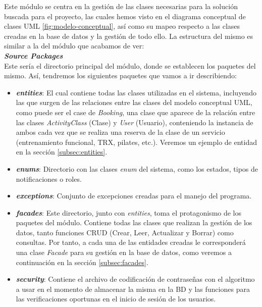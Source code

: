 Este módulo se centra en la gestión de las clases necesarias para la solución buscada para el proyecto, las cuales hemos visto en el diagrama conceptual de clases UML \ref{fig:modelo-conceptual}, así como su mapeo respecto a las clases creadas en la base de datos y la gestión de todo ello. La estructura del mismo es similar a la del módulo que acabamos de ver: 
\\

\textbf{\textit{Source Packages}}
\\

Este sería el directorio principal del módulo, donde se establecen los paquetes del mismo. Así, tendremos los siguientes paquetes que vamos a ir describiendo: 

\begin{itemize}
\item \textbf{\textit{entities}}: El cual contiene todas las clases utilizadas en el sistema, incluyendo las que surgen de las relaciones entre las clases del modelo conceptual UML, como puede ser el case de \textit{Booking}, una clase que aparece de la relación entre las clases \textit{ActivityClass} (Clase) y \textit{User} (Usuario), conteniendo la instancia de ambos cada vez que se realiza una reserva de la clase de un servicio (entrenamiento funcional, TRX, pilates, etc.). Veremos un ejemplo de entidad en la sección \ref{subsec:entities}.
\item \textbf{\textit{enums}}: Directorio con las clases \textit{enum} del sistema, como los estados, tipos de notificaciones o roles.
\item \textbf{\textit{exceptions}}: Conjunto de excepciones creadas para el manejo del programa.
\item \textbf{\textit{facades}}: Este directorio, junto con \textit{entities}, toma el protagonismo de los paquetes del módulo. Contiene todas las clases que realizan la gestión de los datos, tanto funciones CRUD (Crear, Leer, Actualizar y Borrar) como consultas. Por tanto, a cada una de las entidades creadas le corresponderá una clase \textit{Facade} para su gestión en la base de datos, como veremos a continuación en la sección \ref{subsec:facades}.
\item \textbf{\textit{security}}: Contiene el archivo de codificación de contraseñas con el algoritmo a usar en el momento de almacenar la misma en la BD y las funciones para las verificaciones oportunas en el inicio de sesión de los usuarios.
\end{itemize}
\\

